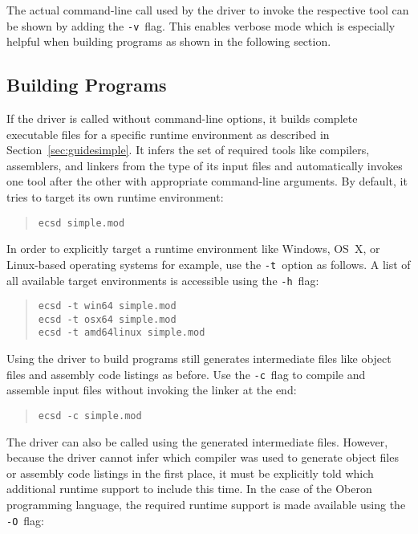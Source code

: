 The actual command-line call used by the driver to invoke the respective tool can be shown by adding the \texttt{-v}~flag.
This enables verbose mode which is especially helpful when building programs as shown in the following section.

\subsection{Building Programs}

If the driver is called without command-line options, it builds complete executable files for a specific runtime environment as described in Section~\ref{sec:guidesimple}.
It infers the set of required tools like compilers, assemblers, and linkers from the type of its input files and automatically invokes one tool after the other with appropriate command-line arguments.
By default, it tries to target its own runtime environment:

\begin{quote}\begin{verbatim}
ecsd simple.mod
\end{verbatim}\end{quote}

In order to explicitly target a runtime environment like Windows, OS~X, or Linux-based operating systems for example, use the \texttt{-t}~option as follows.
A list of all available target environments is accessible using the \texttt{-h}~flag:

\begin{quote}\begin{verbatim}
ecsd -t win64 simple.mod
ecsd -t osx64 simple.mod
ecsd -t amd64linux simple.mod
\end{verbatim}\end{quote}

Using the driver to build programs still generates intermediate files like object files and assembly code listings as before.
Use the \texttt{-c}~flag to compile and assemble input files without invoking the linker at the end:

\begin{quote}\begin{verbatim}
ecsd -c simple.mod
\end{verbatim}\end{quote}

The driver can also be called using the generated intermediate files.
However, because the driver cannot infer which compiler was used to generate object files or assembly code listings in the first place, it must be explicitly told which additional runtime support to include this time.
In the case of the Oberon programming language, the required runtime support is made available using the \texttt{-O}~flag:

